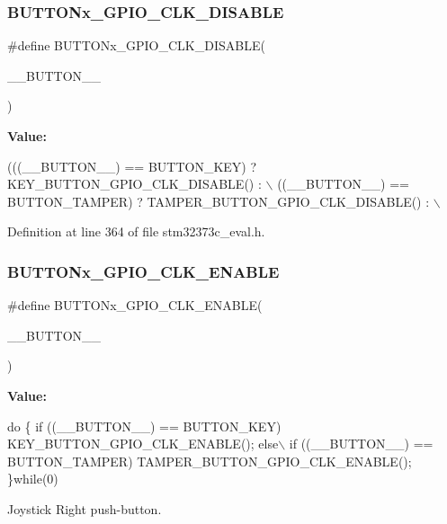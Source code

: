 \subsubsection{B\+U\+T\+T\+O\+Nx\+\_\+\+G\+P\+I\+O\+\_\+\+C\+L\+K\+\_\+\+D\+I\+S\+A\+B\+LE}
{\footnotesize\ttfamily \#define B\+U\+T\+T\+O\+Nx\+\_\+\+G\+P\+I\+O\+\_\+\+C\+L\+K\+\_\+\+D\+I\+S\+A\+B\+LE(\begin{DoxyParamCaption}\item[{}]{\+\_\+\+\_\+\+B\+U\+T\+T\+O\+N\+\_\+\+\_\+ }\end{DoxyParamCaption})}

{\bfseries Value\+:}
\begin{DoxyCode}
(((\_\_BUTTON\_\_) == BUTTON_KEY) ? KEY_BUTTON_GPIO_CLK_DISABLE() : \(\backslash\)
    ((\_\_BUTTON\_\_) == BUTTON_TAMPER) ? TAMPER_BUTTON_GPIO_CLK_DISABLE() : \(\backslash\)
\end{DoxyCode}


Definition at line 364 of file stm32373c\+\_\+eval.\+h.

\mbox{\label{group___b_u_t_t_o_n_ga2158e81f5bb26db14f94ccfaa705a98f}} 
\subsubsection{B\+U\+T\+T\+O\+Nx\+\_\+\+G\+P\+I\+O\+\_\+\+C\+L\+K\+\_\+\+E\+N\+A\+B\+LE}
{\footnotesize\ttfamily \#define B\+U\+T\+T\+O\+Nx\+\_\+\+G\+P\+I\+O\+\_\+\+C\+L\+K\+\_\+\+E\+N\+A\+B\+LE(\begin{DoxyParamCaption}\item[{}]{\+\_\+\+\_\+\+B\+U\+T\+T\+O\+N\+\_\+\+\_\+ }\end{DoxyParamCaption})}

{\bfseries Value\+:}
\begin{DoxyCode}
\textcolor{keywordflow}{do} \{ \textcolor{keywordflow}{if} ((\_\_BUTTON\_\_) == BUTTON_KEY) KEY_BUTTON_GPIO_CLK_ENABLE(); else\(\backslash\)
    if ((\_\_BUTTON\_\_) == BUTTON_TAMPER) TAMPER_BUTTON_GPIO_CLK_ENABLE(); \}\textcolor{keywordflow}{while}(0)
\end{DoxyCode}


Joystick Right push-\/button. 

